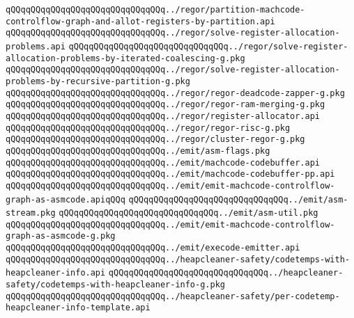 \verb|qQQqqQQqqQQqqQQqqQQqqQQqqQQqqQQq../regor/partition-machcode-controlflow-graph-and-allot-registers-by-partition.api|\newline
\verb|qQQqqQQqqQQqqQQqqQQqqQQqqQQqqQQq../regor/solve-register-allocation-problems.api|\newline
\verb|qQQqqQQqqQQqqQQqqQQqqQQqqQQqqQQq../regor/solve-register-allocation-problems-by-iterated-coalescing-g.pkg|\newline
\verb|qQQqqQQqqQQqqQQqqQQqqQQqqQQqqQQq../regor/solve-register-allocation-problems-by-recursive-partition-g.pkg|\newline
\verb|qQQqqQQqqQQqqQQqqQQqqQQqqQQqqQQq../regor/regor-deadcode-zapper-g.pkg|\newline
\verb|qQQqqQQqqQQqqQQqqQQqqQQqqQQqqQQq../regor/regor-ram-merging-g.pkg|\newline
\verb|qQQqqQQqqQQqqQQqqQQqqQQqqQQqqQQq../regor/register-allocator.api|\newline
\verb|qQQqqQQqqQQqqQQqqQQqqQQqqQQqqQQq../regor/regor-risc-g.pkg|\newline
\verb|qQQqqQQqqQQqqQQqqQQqqQQqqQQqqQQq../regor/cluster-regor-g.pkg|\newline
\verb|qQQqqQQqqQQqqQQqqQQqqQQqqQQqqQQq../emit/asm-flags.pkg|\newline
\verb|qQQqqQQqqQQqqQQqqQQqqQQqqQQqqQQq../emit/machcode-codebuffer.api|\newline
\verb|qQQqqQQqqQQqqQQqqQQqqQQqqQQqqQQq../emit/machcode-codebuffer-pp.api|\newline
\verb|qQQqqQQqqQQqqQQqqQQqqQQqqQQqqQQq../emit/emit-machcode-controlflow-graph-as-asmcode.apiqQQq|\newline
\verb|qQQqqQQqqQQqqQQqqQQqqQQqqQQqqQQq../emit/asm-stream.pkg|\newline
\verb|qQQqqQQqqQQqqQQqqQQqqQQqqQQqqQQq../emit/asm-util.pkg|\newline
\verb|qQQqqQQqqQQqqQQqqQQqqQQqqQQqqQQq../emit/emit-machcode-controlflow-graph-as-asmcode-g.pkg|\newline
\verb|qQQqqQQqqQQqqQQqqQQqqQQqqQQqqQQq../emit/execode-emitter.api|\newline
\verb|qQQqqQQqqQQqqQQqqQQqqQQqqQQqqQQq../heapcleaner-safety/codetemps-with-heapcleaner-info.api|\newline
\verb|qQQqqQQqqQQqqQQqqQQqqQQqqQQqqQQq../heapcleaner-safety/codetemps-with-heapcleaner-info-g.pkg|\newline
\verb|qQQqqQQqqQQqqQQqqQQqqQQqqQQqqQQq../heapcleaner-safety/per-codetemp-heapcleaner-info-template.api|\newline
